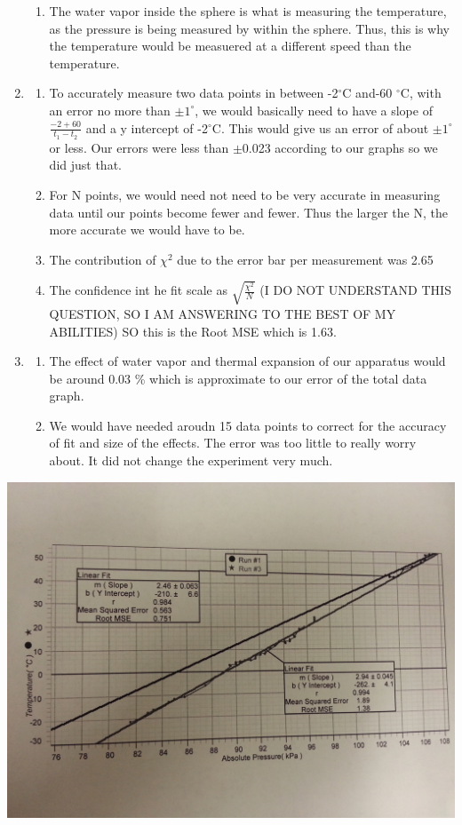 \documentclass[12pt]{report}
\begin{document}
\begin{enumerate}
\begin{enumerate}
			\item The water vapor inside the sphere is what is measuring the temperature, as the pressure is being measured by within the sphere. Thus, this is why the temperature would be measuered at a different speed than the temperature. 
		\end{enumerate}
		\item
		\begin{enumerate}
			\item To accurately measure two data points in between -2$^{\circ}$C and-60 $^{\circ}$C, with an error no more than $\pm 1^{\circ}$, we would basically need to have a slope of $\frac{-2 + 60}{t_1 - t_2}$ and a y intercept of -2$^{\circ}$C. This would give us an error of about $\pm 1^{\circ}$ or less. Our errors were less than $\pm$0.023 according to our graphs so we did just that.
			\item For N points, we would need not need to be very accurate in measuring data until our points become fewer and fewer. Thus the larger the N, the more accurate we would have to be.
			\item The contribution of  $\chi ^2$ due to the error bar per measurement was 2.65
			\item The confidence int he fit scale as $\sqrt{\frac{\chi ^2}{N}}$ (I DO NOT UNDERSTAND THIS QUESTION, SO I AM ANSWERING TO THE BEST OF MY ABILITIES) SO this is the Root MSE which is 1.63.
		\end{enumerate}
		\item
		\begin{enumerate}
			\item The effect of water vapor and thermal expansion of our apparatus would be around 0.03 \%  which is approximate to our error of the total data graph.
			\item We would have needed aroudn 15 data points to correct for the accuracy of fit and size of the effects. The error was too little to really worry about. It did not change the experiment very much.

			
		\end{enumerate}
\end{enumerate}
\includegraphics[scale=0.2]{both_graphs}
\end{document}

